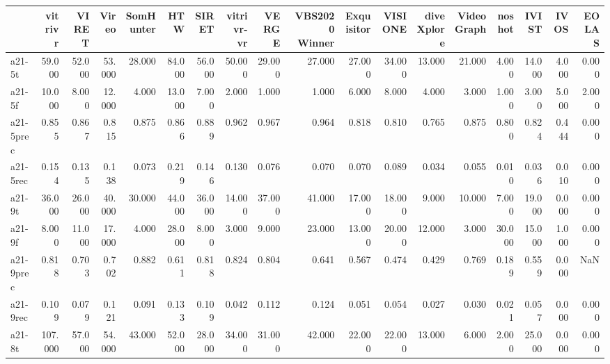 \begin{tabular}{lrrrrrrrrrrrrrrrrr}
\toprule
{} &  vitrivr &    VIRET &    Vireo &  SomHunter &     HTW &    SIRET &  vitrivr-vr &    VERGE &  VBS2020 Winner &  Exquisitor &  VISIONE &  diveXplore &  VideoGraph &   noshot &   IVIST &    IVOS &   EOLAS \\
\midrule
a21-5t     &   59.000 &   52.000 &   53.000 &     28.000 &  84.000 &   56.000 &      50.000 &   29.000 &          27.000 &      27.000 &   34.000 &      13.000 &      21.000 &    4.000 &  14.000 &   4.000 &   0.000 \\
a21-5f     &   10.000 &    8.000 &   12.000 &      4.000 &  13.000 &    7.000 &       2.000 &    1.000 &           1.000 &       6.000 &    8.000 &       4.000 &       3.000 &    1.000 &   3.000 &   5.000 &   2.000 \\
a21-5prec  &    0.855 &    0.867 &    0.815 &      0.875 &   0.866 &    0.889 &       0.962 &    0.967 &           0.964 &       0.818 &    0.810 &       0.765 &       0.875 &    0.800 &   0.824 &   0.444 &   0.000 \\
a21-5rec   &    0.154 &    0.135 &    0.138 &      0.073 &   0.219 &    0.146 &       0.130 &    0.076 &           0.070 &       0.070 &    0.089 &       0.034 &       0.055 &    0.010 &   0.036 &   0.010 &   0.000 \\
a21-9t     &   36.000 &   26.000 &   40.000 &     30.000 &  44.000 &   36.000 &      14.000 &   37.000 &          41.000 &      17.000 &   18.000 &       9.000 &      10.000 &    7.000 &  19.000 &   0.000 &   0.000 \\
a21-9f     &    8.000 &   11.000 &   17.000 &      4.000 &  28.000 &    8.000 &       3.000 &    9.000 &          23.000 &      13.000 &   20.000 &      12.000 &       3.000 &   30.000 &  15.000 &   1.000 &   0.000 \\
a21-9prec  &    0.818 &    0.703 &    0.702 &      0.882 &   0.611 &    0.818 &       0.824 &    0.804 &           0.641 &       0.567 &    0.474 &       0.429 &       0.769 &    0.189 &   0.559 &   0.000 &     NaN \\
a21-9rec   &    0.109 &    0.079 &    0.121 &      0.091 &   0.133 &    0.109 &       0.042 &    0.112 &           0.124 &       0.051 &    0.054 &       0.027 &       0.030 &    0.021 &   0.057 &   0.000 &   0.000 \\
a21-8t     &  107.000 &   57.000 &   54.000 &     43.000 &  52.000 &   28.000 &      34.000 &   31.000 &          42.000 &      22.000 &   22.000 &      13.000 &       6.000 &    2.000 &  25.000 &   0.000 &   0.000 \\

\end{tabular}
